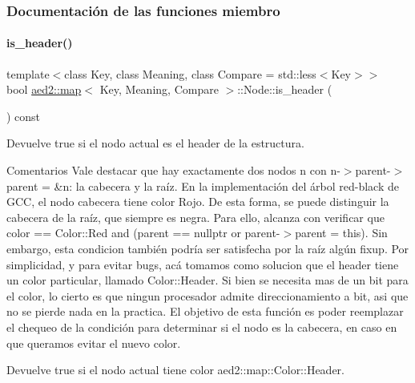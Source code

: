 \subsubsection{Documentación de las funciones miembro}
\mbox{\label{structaed2_1_1map_1_1Node_ab684678442a3c5f53eb00ed48a9270a9_ab684678442a3c5f53eb00ed48a9270a9}} 
\paragraph{\texorpdfstring{is\+\_\+header()}{is\_header()}}
{\footnotesize\ttfamily template$<$class Key, class Meaning, class Compare = std\+::less$<$\+Key$>$$>$ \\
bool \hyperlink{classaed2_1_1map}{aed2\+::map}$<$ Key, Meaning, Compare $>$\+::Node\+::is\+\_\+header (\begin{DoxyParamCaption}{ }\end{DoxyParamCaption}) const\hspace{0.3cm}{\ttfamily [inline]}}



Devuelve true si el nodo actual es el header de la estructura. 

\begin{DoxyRemark}{Comentarios}
Vale destacar que hay exactamente dos nodos n con n-\/$>$parent-\/$>$parent = \&n\+: la cabecera y la raíz. En la implementación del árbol red-\/black de G\+CC, el nodo cabecera tiene color Rojo. De esta forma, se puede distinguir la cabecera de la raíz, que siempre es negra. Para ello, alcanza con verificar que {\ttfamily color == Color\+::\+Red and (parent == nullptr or parent-\/$>$parent = this)}. Sin embargo, esta condicion también podría ser satisfecha por la raíz algún {\ttfamily fixup}. Por simplicidad, y para evitar bugs, acá tomamos como solucion que el header tiene un color particular, llamado Color\+::\+Header. Si bien se necesita mas de un bit para el color, lo cierto es que ningun procesador admite direccionamiento a bit, asi que no se pierde nada en la practica. El objetivo de esta función es poder reemplazar el chequeo de la condición para determinar si el nodo es la cabecera, en caso en que queramos evitar el nuevo color.
\end{DoxyRemark}
\begin{DoxyReturn}{Devuelve}
true si el nodo actual tiene color aed2\+::map\+::\+Color\+::\+Header.
\end{DoxyReturn}

